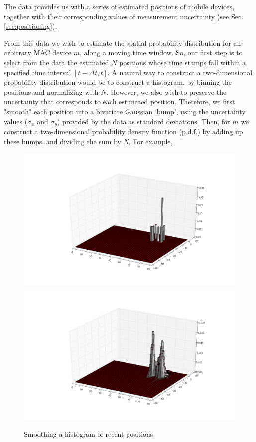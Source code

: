 \documentclass[10pt,a4paper]{article}
\begin{document}
The data provides us with a series of estimated positions of mobile devices, together with their corresponding values of measurement uncertainty (see Sec.\ref{sec:positioning}).

From this data we wish to estimate the spatial probability distribution for an arbitrary MAC device $m$, along a moving time window.
So, our first step is to select from the data the estimated $N$ positions whose time stamps fall within a specified time interval $[t-\Delta t,t]$.
A natural way to construct a two-dimensional probability distribution would be to construct a histogram, by binning the positions and normalizing with $N$.
However, we also wish to preserve the uncertainty that corresponds to each estimated position.
Therefore, we first "smooth" each position into a bivariate Gaussian `bump', using the uncertainty values ($\sigma_{x}$ and $\sigma_{y}$) provided by the data as standard deviations. Then, for  $m$ we construct a two-dimensional probability density function (p.d.f.) by adding up these bumps, and  dividing the sum by $N$. For example, 
\begin{figure}[h!]
	\centering
	\includegraphics[width=130mm]{non-smoothed-histo.png}
	\hfill 
	\includegraphics[width=130mm]{smoothed-histo.png}
	\caption{Smoothing a histogram of recent positions}
	\label{fig:smoothing}
	
	
\end{figure}
\end{document}
